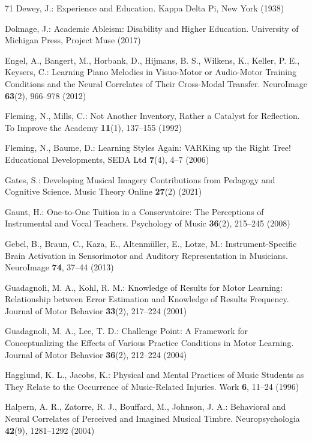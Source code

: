 \documentclass[runningheads]{llncs}
\begin{document}
\begin{thebibliography}{71}
Dewey, J.: Experience and Education. Kappa Delta Pi, New York (1938)

Dolmage, J.: Academic Ableism: Disability and Higher Education. University of Michigan Press, Project Muse (2017)

Engel, A., Bangert, M., Horbank, D., Hijmans, B. S., Wilkens, K., Keller, P. E., Keysers, C.: Learning Piano Melodies in Visuo-Motor or Audio-Motor Training Conditions and the Neural Correlates of Their Cross-Modal Transfer. NeuroImage \textbf{63}(2), 966--978 (2012)

Fleming, N., Mills, C.: Not Another Inventory, Rather a Catalyst for Reflection. To Improve the Academy \textbf{11}(1), 137--155 (1992)

Fleming, N., Baume, D.: Learning Styles Again: VARKing up the Right Tree! Educational Developments, SEDA Ltd \textbf{7}(4), 4--7 (2006)

Gates, S.: Developing Musical Imagery Contributions from Pedagogy and Cognitive Science. Music Theory Online \textbf{27}(2) (2021)

Gaunt, H.: One-to-One Tuition in a Conservatoire: The Perceptions of Instrumental and Vocal Teachers. Psychology of Music \textbf{36}(2), 215--245 (2008)

Gebel, B., Braun, C., Kaza, E., Altenmüller, E., Lotze, M.: Instrument-Specific Brain Activation in Sensorimotor and Auditory Representation in Musicians. NeuroImage \textbf{74}, 37--44 (2013)

Guadagnoli, M. A., Kohl, R. M.: Knowledge of Results for Motor Learning: Relationship between Error Estimation and Knowledge of Results Frequency. Journal of Motor Behavior \textbf{33}(2), 217--224 (2001)

Guadagnoli, M. A., Lee, T. D.: Challenge Point: A Framework for Conceptualizing the Effects of Various Practice Conditions in Motor Learning. Journal of Motor Behavior \textbf{36}(2), 212--224 (2004)

Hagglund, K. L., Jacobs, K.: Physical and Mental Practices of Music Students as They Relate to the Occurrence of Music-Related Injuries. Work \textbf{6}, 11--24 (1996)

Halpern, A. R., Zatorre, R. J., Bouffard, M., Johnson, J. A.: Behavioral and Neural Correlates of Perceived and Imagined Musical Timbre. Neuropsychologia \textbf{42}(9), 1281--1292 (2004)


\end{thebibliography}
\end{document}
